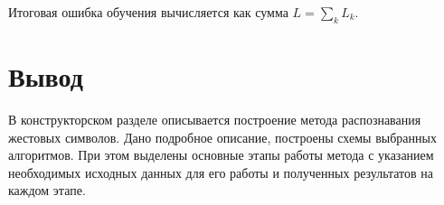 Итоговая ошибка обучения вычисляется как сумма $L = \sum_{k} L_k$.

\section{Вывод}

В конструкторском разделе описывается построение метода распознавания жестовых символов. Дано подробное описание, построены схемы выбранных алгоритмов. При этом выделены основные этапы работы метода с указанием необходимых исходных данных для его работы и полученных результатов на каждом этапе.